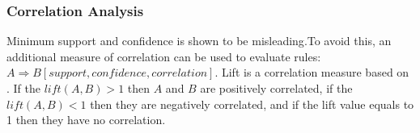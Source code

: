 \subsubsection{Correlation Analysis}
Minimum support and confidence is shown to be misleading\cite{Lin:2002:CSS:646420.693806}.To avoid this, an additional measure of correlation can be used to evaluate rules:\ $A\Rightarrow B [support, confidence, correlation]$. 
Lift is a correlation measure based on .
If the $lift(A,B) > 1$ then $A$ and $B$ are positively correlated,
if the $lift(A,B) < 1$ then they are negatively correlated, 
and if the lift value equals to 1  then they have no correlation. 

